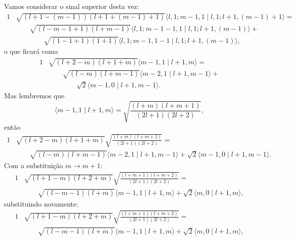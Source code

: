 \documentclass{article}
\newcommand{\braket}[2]{\langle #1 \!\mid\! #2 \rangle}
\begin{document}
Vamos considerar o sinal superior desta vez:
\begin{alignat}{1}
\nonumber
 &\sqrt{(l + 1 - (m - 1))(l + 1 + (m - 1) + 1)} \braket{l, 1;m - 1,1}{l,1;l + 1,(m - 1) + 1} = \\ \nonumber
 &\qquad \sqrt{(l - m - 1 + 1)(l + m - 1)} \braket{l, 1;m - 1-1,1}{l,1;l + 1,(m - 1)} + \\
 &\qquad \qquad \sqrt{(1 - 1 + 1)(1 + 1)} \braket{l, 1;m - 1,1-1}{l,1;l + 1,(m - 1)} \mathrm{,}
\end{alignat}
o que ficará como
\begin{alignat}{1}
\nonumber
 &\sqrt{(l + 2 - m)(l + 1 + m)} \braket{m - 1,1}{l + 1,m} = \\ \nonumber
 &\qquad \sqrt{(l - m)(l + m - 1)} \braket{m - 2,1}{l + 1,m - 1} + \\
 &\qquad \qquad \sqrt{2} \braket{m - 1,0}{l + 1,m - 1} \mathrm{.}
\end{alignat}
Mas lembremos que
\begin{equation}
 \braket{m - 1,1}{l + 1,m} = \sqrt{\frac{(l + m)(l + m + 1)}{(2l + 1)(2l + 2)}} \mathrm{,}
\end{equation}
então
\begin{alignat}{1}
\nonumber
 &\sqrt{(l + 2 - m)(l + 1 + m)} \sqrt{\frac{(l + m)(l + m + 1)}{(2l + 1)(2l + 2)}} = \\
 &\qquad \sqrt{(l - m)(l + m - 1)} \braket{m - 2,1}{l + 1,m - 1} + \sqrt{2} \braket{m - 1,0}{l + 1,m - 1} \mathrm{.}
\end{alignat}
Com a substituição $m \to m + 1$:
\begin{alignat}{1}
\nonumber
 &\sqrt{(l + 1 - m)(l + 2 + m)} \sqrt{\frac{(l + m + 1)(l + m + 2)}{(2l + 1)(2l + 2)}} = \\
 &\qquad \sqrt{(l - m - 1)(l + m)} \braket{m - 1,1}{l + 1,m} + \sqrt{2} \braket{m,0}{l + 1,m} \mathrm{,}
\end{alignat}
substituindo novamente:
\begin{alignat}{1}
\nonumber
 &\sqrt{(l + 1 - m)(l + 2 + m)} \sqrt{\frac{(l + m + 1)(l + m + 2)}{(2l + 1)(2l + 2)}} = \\
 &\qquad \sqrt{(l - m - 1)(l + m)} \braket{m - 1,1}{l + 1,m} + \sqrt{2} \braket{m,0}{l + 1,m} \mathrm{,}
\end{alignat}
\end{document}
